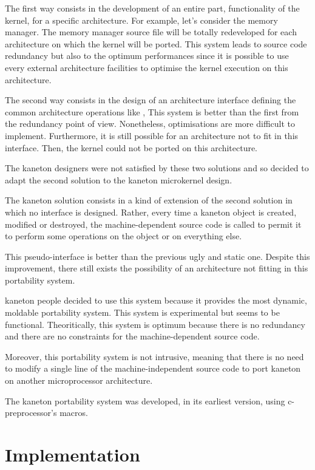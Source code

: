 \begin{multicols}{2}
The first way consists in the development of an entire part, functionality
of the kernel, for a specific architecture. For example, let's consider the
memory manager. The memory manager source file will be totally redeveloped
for each architecture on which the kernel will be ported. This system leads
to source code redundancy but also to the optimum performances since
it is possible to use every external architecture facilities to optimise
the kernel execution on this architecture.

The second way consists in the design of an architecture interface defining
the common architecture operations like ,
 \etc{} This system is better than the
first from the redundancy point of view. Nonetheless, optimisations are more
difficult to implement. Furthermore, it is still possible for an architecture
not to fit in this interface. Then, the kernel could not be ported on
this architecture.

The kaneton designers were not satisfied by these two solutions and so
decided to adapt the second solution to the kaneton microkernel design.

The kaneton solution consists in a kind of extension of the second solution
in which no interface is designed. Rather, every time a kaneton object is
created, modified or destroyed, the machine-dependent source code is called
to permit it to perform some operations on the object or on everything else.

This pseudo-interface is better than the previous ugly and static one.
Despite this improvement, there still exists the possibility of an
architecture not fitting in this portability system.

kaneton people decided to use this system because it provides the most
dynamic, moldable portability system. This system is experimental but
seems to be functional. Theoritically, this system is optimum because
there is no redundancy and there are no constraints for the
machine-dependent source code.

Moreover, this portability system is not intrusive, meaning that there
is no need to modify a single line of the machine-independent source code
to port kaneton on another microprocessor architecture.

The kaneton portability system was developed, in its earliest version,
using c-preprocessor's macros.

%
%

\section{Implementation}


\end{multicols}
